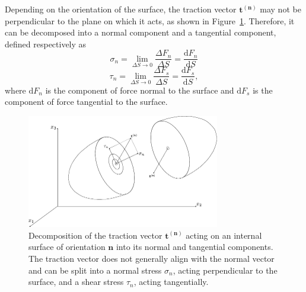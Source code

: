 \documentclass[a4paper,11pt]{article}
\begin{document}
Depending on the orientation of the surface, the traction vector $\mathbf{t}^{(\mathbf{n})}$ may not be perpendicular to the plane on which it acts, as shown in Figure~\ref{cauchydecomp}. 
Therefore, it can be decomposed into a normal component and a tangential component, defined respectively as
\begin{equation}
\sigma_n = \lim_{\Delta S \to 0} \frac{\Delta F_n}{\Delta S} = \frac{\mathrm{d}F_n}{\mathrm{d}S}
\end{equation}
\begin{equation}
\tau_n = \lim_{\Delta S \to 0} \frac{\Delta F_s}{\Delta S} = \frac{\mathrm{d}F_s}{\mathrm{d}S},
\end{equation}
where $\mathrm{d}F_n$ is the component of force normal to the surface and $\mathrm{d}F_s$ is the component of force tangential to the surface.

\begin{figure}[H]
\centering
\includegraphics[width=0.75\textwidth]{images/cauchydecomp.pdf}
\caption{Decomposition of the traction vector $\mathbf{t}^{(\mathbf{n})}$ acting on an internal surface of orientation $\mathbf{n}$ into its normal and tangential components. The traction vector does not generally align with the normal vector and can be split into a normal stress $\sigma_n$, acting perpendicular to the surface, and a shear stress $\tau_n$, acting tangentially. }
\label{cauchydecomp}
\end{figure}
\end{document}
